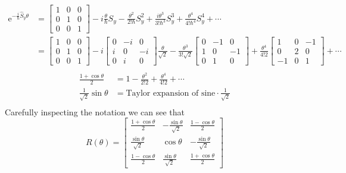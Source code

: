 \documentclass[letter]{article}
\newcommand{\hb}{\hbar}
\begin{document}
\begin{align*}
	\mathrm{e}^{-\frac{i}{\hb} \hat{S}_y \theta } &= 
	\begin{bmatrix} 1 & 0 & 0 \\ 0 & 1 & 0 \\ 0 & 0 & 1  \end{bmatrix}  
	- i \frac{\theta}{\hb} S_y - 
	\frac{\theta^2}{2! \hb } S_y ^2+ 
	\frac{i \theta^3}{3! \hb ^3} S_y ^3 + 
	\frac{\theta^{4}}{4! \hb ^{4} } S_y ^{4} + \cdots 
	\\
	&= 
	\begin{bmatrix} 1 & 0 & 0 \\ 0 & 1 & 0 \\ 0 & 0 & 1  \end{bmatrix}   -  
	i \begin{bmatrix} 0 & -i & 0 \\ i & 0 & -i \\ 0 & i & 0 \end{bmatrix}  
	\frac{\theta}{\sqrt{2} } 
	- \frac{\theta^3}{3! \sqrt{2}  } 
	\begin{bmatrix} 0 & -1 & 0 \\ 1 & 0 & -1 \\ 0 & 1 & 0  \end{bmatrix}  + 
	\frac{\theta^{4}}{4! 2} 
	\begin{bmatrix} 1 & 0 & -1 \\ 0 & 2 & 0 \\ -1 & 0 & 1 \end{bmatrix}  + \cdots 
	\\
\end{align*}
\begin{align*}
	\frac{1 + \cos \theta}{2} &= 1 - \frac{\theta^2}{2! 2} +
	\frac{\theta^{4}}{4! 2 } + \cdots \\ 
	\frac{1}{\sqrt{2} } \sin \theta &= \text{Taylor expansion of sine} \cdot \frac{1}{\sqrt{2} } \\ 
\end{align*}
Carefully inspecting the notation we can see that 
\[
R(\theta) = 
\begin{bmatrix} 
	\frac{1 + \cos \theta}{2} & 
	- \frac{\sin \theta}{\sqrt{2} } & 
	\frac{1 - \cos \theta}{2} \\ 
	\frac{\sin \theta}{\sqrt{2}  } & 
	\cos \theta & 
	- \frac{\sin \theta}{\sqrt{2} } \\ 
	\frac{1 - \cos \theta }{2} & 
	\frac{\sin \theta}{\sqrt{2} } & 
\frac{1 + \cos \theta }{2} 
\end{bmatrix} 
\]
\end{document}
